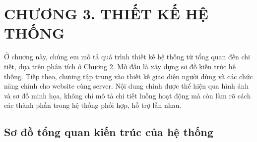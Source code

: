 
\section*{CHƯƠNG 3. THIẾT KẾ HỆ THỐNG}
\setcounter{section}{3}
\setcounter{subsection}{0} %
\setcounter{table}{0} %
\setcounter{figure}{0} %

Ở chương này, chúng em mô tả quá trình thiết kế hệ thống từ tổng quan đến chi tiết, dựa trên phân tích ở Chương 2.
Mở đầu là xây dựng sơ đồ kiến trúc hệ thống.
Tiếp theo, chương tập trung vào thiết kế giao diện người dùng và các chức năng chính cho website cùng server.
Nội dung chính được thể hiện qua hình ảnh và sơ đồ minh họa, không chỉ mô tả chi tiết luồng hoạt động mà còn làm rõ cách các thành phần trong hệ thống phối hợp, hỗ trợ lẫn nhau.
\subsection{Sơ đồ tổng quan kiến trúc của hệ thống}

